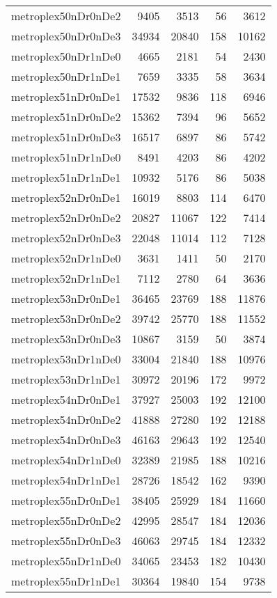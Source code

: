 \begin{longtable}{lrrrr}
metroplex50nDr0nDe2 & 9405 & 3513 & 56 & 3612 \\
metroplex50nDr0nDe3 & 34934 & 20840 & 158 & 10162 \\
metroplex50nDr1nDe0 & 4665 & 2181 & 54 & 2430 \\
metroplex50nDr1nDe1 & 7659 & 3335 & 58 & 3634 \\
metroplex51nDr0nDe1 & 17532 & 9836 & 118 & 6946 \\
metroplex51nDr0nDe2 & 15362 & 7394 & 96 & 5652 \\
metroplex51nDr0nDe3 & 16517 & 6897 & 86 & 5742 \\
metroplex51nDr1nDe0 & 8491 & 4203 & 86 & 4202 \\
metroplex51nDr1nDe1 & 10932 & 5176 & 86 & 5038 \\
metroplex52nDr0nDe1 & 16019 & 8803 & 114 & 6470 \\
metroplex52nDr0nDe2 & 20827 & 11067 & 122 & 7414 \\
metroplex52nDr0nDe3 & 22048 & 11014 & 112 & 7128 \\
metroplex52nDr1nDe0 & 3631 & 1411 & 50 & 2170 \\
metroplex52nDr1nDe1 & 7112 & 2780 & 64 & 3636 \\
metroplex53nDr0nDe1 & 36465 & 23769 & 188 & 11876 \\
metroplex53nDr0nDe2 & 39742 & 25770 & 188 & 11552 \\
metroplex53nDr0nDe3 & 10867 & 3159 & 50 & 3874 \\
metroplex53nDr1nDe0 & 33004 & 21840 & 188 & 10976 \\
metroplex53nDr1nDe1 & 30972 & 20196 & 172 & 9972 \\
metroplex54nDr0nDe1 & 37927 & 25003 & 192 & 12100 \\
metroplex54nDr0nDe2 & 41888 & 27280 & 192 & 12188 \\
metroplex54nDr0nDe3 & 46163 & 29643 & 192 & 12540 \\
metroplex54nDr1nDe0 & 32389 & 21985 & 188 & 10216 \\
metroplex54nDr1nDe1 & 28726 & 18542 & 162 & 9390 \\
metroplex55nDr0nDe1 & 38405 & 25929 & 184 & 11660 \\
metroplex55nDr0nDe2 & 42995 & 28547 & 184 & 12036 \\
metroplex55nDr0nDe3 & 46063 & 29745 & 184 & 12332 \\
metroplex55nDr1nDe0 & 34065 & 23453 & 182 & 10430 \\
metroplex55nDr1nDe1 & 30364 & 19840 & 154 & 9738 \\

\end{longtable}
